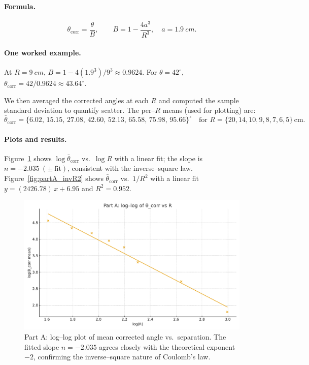 \documentclass[12pt]{article}
\begin{document}
\paragraph{Formula.}
\[
\theta_{\mathrm{corr}}=\frac{\theta}{B},\qquad
B=1-\frac{4a^3}{R^3},\quad a=\SI{1.9}{cm}.
\]

\paragraph{One worked example.}
At $R=\SI{9}{cm}$, $B=1-4(1.9^3)/9^3\approx 0.9624$. For $\theta=42^\circ$,
$\theta_{\mathrm{corr}}=42/0.9624\approx 43.64^\circ$.

We then averaged the corrected angles at each $R$ and computed the sample standard deviation to quantify scatter. The per–$R$ means (used for plotting) are:
\[
\bar\theta_{\mathrm{corr}}=\{6.02,\,15.15,\,27.08,\,42.60,\,52.13,\,65.58,\,75.98,\,95.66\}^\circ
\quad\text{for }R=\{20,14,10,9,8,7,6,5\}\,\text{cm}.
\]

\paragraph{Plots and results.}
Figure~\ref{fig:partA_loglog} shows $\log\bar\theta_{\mathrm{corr}}$ vs.\ $\log R$ with a linear fit; the slope is $n=-2.035\ (\pm\ \text{fit})$, consistent with the inverse–square law.  
Figure~\ref{fig:partA_invR2} shows $\bar\theta_{\mathrm{corr}}$ vs.\ $1/R^2$ with a linear fit $y=(2426.78)\,x + 6.95$ and $R^2=0.952$.

\begin{figure}[H]
  \centering
  \includegraphics[width=0.72\linewidth]{partA_loglog.pdf}
 \caption{Part A: log–log plot of mean corrected angle vs.\ separation.
The fitted slope $n=-2.035$ agrees closely with the theoretical exponent $-2$, confirming the inverse–square nature of Coulomb’s law.}
  \label{fig:partA_loglog}
\end{figure}
\end{document}
